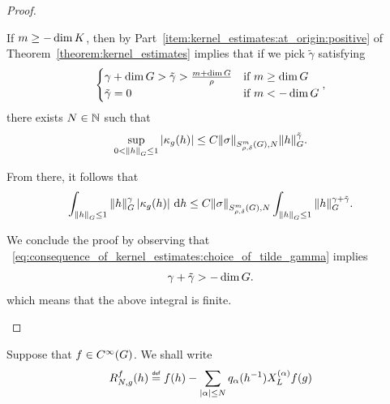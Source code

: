 \begin{proof}
\begin{description}
            If $m \geq -\dim \CompactGroup$,
            then by Part~\eqref{item:kernel_estimates:at_origin:positive} of Theorem~\ref{theorem:kernel_estimates} implies
            that if we pick $\tilde \gamma$ satisfying
            \begin{align}
                \begin{cases}
                    \gamma + \dim \Group > \tilde \gamma > \frac {m + \dim \Group} \rho & \text{if } m \geq \dim \Group\\
                    \tilde \gamma = 0 & \text{if } m < -\dim \Group
                \end{cases},
                \label{eq:consequence_of_kernel_estimates:choice_of_tilde_gamma}
            \end{align}
            there exists $N \in \N$ such that
            \begin{align*}
                \sup_{0 < \norm [\Group] h \leq 1} \abs{\kappa_g(h)}
                \leq
                    C \SymbolSemiNorm m {\rho, \delta} N \sigma \norm [\Group] h^{\tilde \gamma}.
            \end{align*}

            From there, it follows that
            \begin{align*}
                \int_{\norm [\Group] h \leq 1} \norm [\Group] h^\gamma \abs {\kappa_g(h)} \dd h \leq
                C \SymbolSemiNorm m {\rho, \delta} N \sigma
                \int_{\norm [\Group] h \leq 1}
                \norm [\Group] h^{\gamma + \tilde \gamma}.
            \end{align*}

            We conclude the proof by observing that ~\eqref{eq:consequence_of_kernel_estimates:choice_of_tilde_gamma}
            implies
            \begin{align*}
                \gamma + \tilde \gamma > -\dim \Group.
            \end{align*}
            which means that the above integral is finite.
    \end{description}
\end{proof}

\begin{definition}
    Suppose that $f \in \SmoothFunctions \Group$.
    We shall write
    \begin{align}
        \TaylorRemainder f N g(h)
        \defeq f(h) - \sum_{\abs \alpha \leq N} q_\alpha(h^{-1}) \TaylorLeftDifferentialOperator \alpha f(g)
        \label{eq:definition_of_Taylor_remainder}
    \end{align}
\end{definition}

